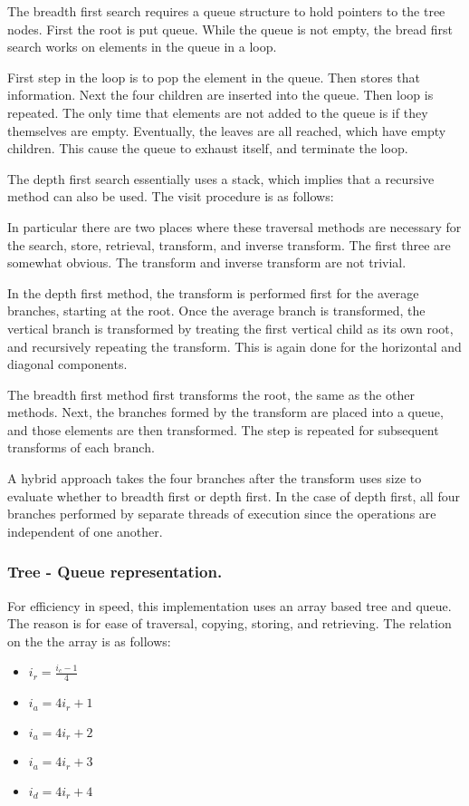 \documentclass[11pt]{article}
\begin{document}
 The breadth first search requires a queue structure to hold pointers to the tree nodes.  First the root is put queue.  While the queue is not empty, the bread first search works on elements in the queue in a loop.  

 First step in the loop is to pop the element in the queue. Then stores that information.  Next the four children are inserted into the queue.  Then loop is repeated.  The only time that elements are not added to the queue is if they themselves are empty.  Eventually, the leaves are all reached, which have empty children.  This cause the queue to exhaust itself, and terminate the loop.  

 The depth first search essentially uses a stack, which implies that a recursive method can also be used.  The visit procedure is as follows:

 In particular there are two places where these traversal methods are necessary for the search, store, retrieval, transform, and inverse transform.  The first three are somewhat obvious.  The transform and inverse transform are not trivial.  

 In the depth first method, the transform is performed first for the average branches, starting at the root.  Once the average branch is transformed, the vertical branch is transformed by treating the first vertical child as its own root, and recursively repeating the transform.  This is again done for the horizontal and diagonal components.  

 The breadth first method first transforms the root, the same as the other methods.  Next, the branches formed by the transform are placed into a queue, and those elements are then transformed.  The step is repeated for subsequent transforms of each branch.  

 A hybrid approach takes the four branches after the transform uses size to evaluate whether to breadth first or depth first.  In the case of depth first, all four branches performed by separate threads of execution since the operations are independent of one another.  

 \subsubsection {Tree - Queue representation.  }
 For efficiency in speed, this implementation uses an array based tree and queue.  The reason is for ease of traversal, copying, storing, and retrieving.  The relation on the the array is as follows:
 \begin{itemize}
 \item $i_r = \frac{i_c -1}{4}$
 \item $ i_a = 4 i_r + 1$
 \item $ i_a = 4 i_r + 2$
 \item $ i_a = 4 i_r + 3$
 \item $ i_d = 4 i_r + 4$
 \end {itemize}
\end{document}
